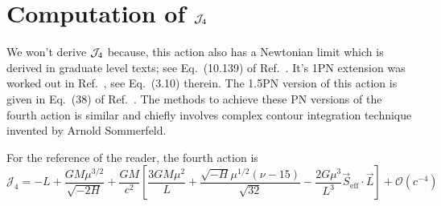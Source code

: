 \section{Computation of $\mathcal{J}_4$}


We won't derive $\mathcal{J}_4$ because, this action also
has a Newtonian limit which is derived in graduate level texts; see
Eq.~(10.139) of Ref.~\cite{goldstein2013classical}. 
It's 1PN extension was worked out in Ref.~\cite{Damour:1988mr}, 
see Eq.~(3.10) therein. The 1.5PN version of this action is given 
in Eq.~(38) of Ref.~\cite{tanay2021integrability}.
The methods to achieve these PN versions of the fourth action
is similar and chiefly involves complex contour integration technique
invented by Arnold Sommerfeld.



For the reference of the reader, the fourth action is
\begin{equation}
\mathcal{J}_{4}=-L+\frac{G M \mu^{3 / 2}}{\sqrt{-2 H}}+\frac{G M}{c^{2}}\left[\frac{3 G M \mu^{2}}{L}+\frac{\sqrt{-H} \mu^{1 / 2}(\nu-15)}{\sqrt{32}}-\frac{2 G \mu^{3}}{L^{3}} \vec{S}_{\mathrm{eff}} \cdot \vec{L}\right]+\mathcal{O}\left(c^{-4}\right)
\end{equation}



















